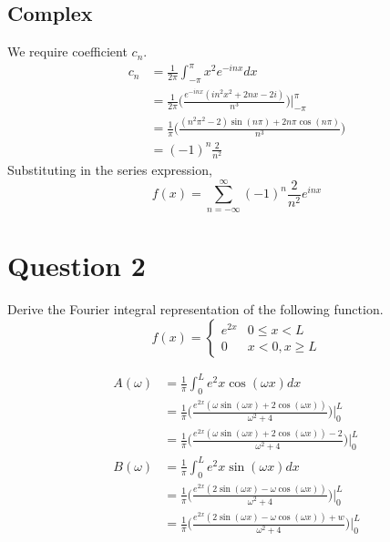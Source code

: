 \documentclass[12pt]{article}
\begin{document}
\subsection*{Complex}
We require coefficient $c_n$.
\begin{align*}
  c_n &= \frac{1}{2\pi}\int_{-\pi}^{\pi} x^2e^{-inx} dx \\
  &= \frac{1}{2\pi} \bigg( \frac{e^{-inx}(in^2x^2 + 2nx - 2i)}{n^3}\bigg) \bigg|_{-\pi}^{\pi} \\
  &= \frac{1}{\pi} \bigg( \frac{(n^2\pi^2-2)\sin(n\pi) + 2n\pi\cos(n\pi)}{n^3}\bigg) \\
  &= (-1)^n \frac{2}{n^2}
\end{align*}
Substituting in the series expression,
$$f(x) = \sum_{n=-\infty}^{\infty} (-1)^n \frac{2}{n^2} e^{inx}$$

\section*{Question 2}
Derive the Fourier integral representation of the following function.
$$f(x) =
\begin{cases}
e^{2x} & 0 \leq x < L \\
0 & x < 0, x \geq L
\end{cases}$$

\begin{align*}
  A(\omega) &= \frac{1}{\pi} \int_0^L e^2x\cos(\omega x) dx \\
  &= \frac{1}{\pi} \bigg( \frac{e^{2x}(\omega \sin(\omega x) + 2\cos(\omega x))}{\omega^2 + 4} \bigg) \bigg|_0^L \\
  &= \frac{1}{\pi} \bigg( \frac{e^{2x}(\omega \sin(\omega x) + 2\cos(\omega x)) - 2}{\omega^2 + 4} \bigg) \bigg|_0^L \\
  B(\omega) &= \frac{1}{\pi} \int_0^L e^2x\sin(\omega x) dx \\
  &= \frac{1}{\pi} \bigg( \frac{e^{2x}(2\sin(\omega x) - \omega \cos(\omega x))}{\omega^2 + 4} \bigg) \bigg|_0^L \\
  &= \frac{1}{\pi} \bigg( \frac{e^{2x}(2\sin(\omega x) - \omega \cos(\omega x)) + w}{\omega^2 + 4} \bigg) \bigg|_0^L
\end{align*}
\end{document}
